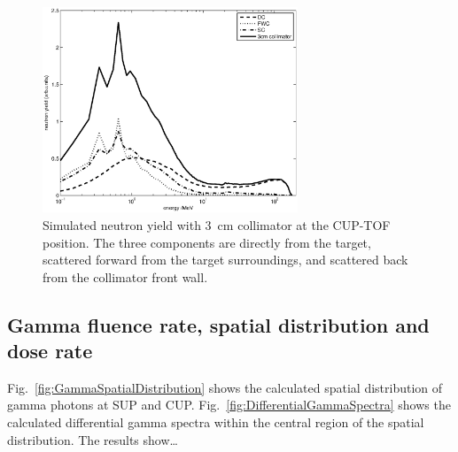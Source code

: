 \documentclass[11pt,a4paper]{IEEEtran}
\let\MYoriglatexcaption\caption
\renewcommand{\caption}[2][\relax]{\MYoriglatexcaption[#2]{#2}}
\begin{document}
\begin{figure}[!t]
	\centering
	\includegraphics[width=3in]{TOF3Componentslinear.eps}
	\caption{
    Simulated neutron yield with \SI{3}{\cm} collimator at the CUP-TOF position.
    The three components are directly from the target, scattered forward from the target surroundings, and scattered back from the collimator front wall.}
	\label{fig:TOF3Componentslinear}
\end{figure}

\subsection{Gamma fluence rate, spatial distribution and dose rate}

Fig.~\ref{fig:GammaSpatialDistribution} shows the calculated spatial distribution of gamma photons at SUP and CUP.
Fig.~\ref{fig:DifferentialGammaSpectra} shows the calculated differential gamma spectra within the central region of the spatial distribution.
The results show\ldots{}
\end{document}
